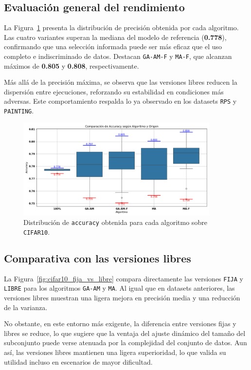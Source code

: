 \subsection{Evaluación general del rendimiento}
La Figura~\ref{fig:cifar10_boxplot} presenta la distribución de precisión obtenida por cada algoritmo.
Las cuatro variantes superan la mediana del modelo de referencia (\textbf{0.778}), confirmando que una selección informada puede ser más eficaz que el uso completo e indiscriminado de datos.
Destacan \texttt{GA-AM-F} y \texttt{MA-F}, que alcanzan máximos de \textbf{0.805} y \textbf{0.808}, respectivamente.

Más allá de la precisión máxima, se observa que las versiones libres reducen la dispersión entre ejecuciones, reforzando su estabilidad en condiciones más adversas.
Este comportamiento respalda lo ya observado en los datasets \texttt{RPS} y \texttt{PAINTING}.

\begin{figure}[htp]
  \centering
  \includegraphics[width=0.9\textwidth]{imagenes/evaluaciones/cifar10/boxplot-por-algoritmo.png}
  \caption{Distribución de \texttt{accuracy} obtenida para cada algoritmo sobre \texttt{CIFAR10}.}
  \label{fig:cifar10_boxplot}
\end{figure}

\subsection{Comparativa con las versiones libres}
La Figura~\ref{fig:cifar10_fija_vs_libre} compara directamente las versiones \texttt{FIJA} y \texttt{LIBRE} para los algoritmos \texttt{GA-AM} y \texttt{MA}.
Al igual que en datasets anteriores, las versiones libres muestran una ligera mejora en precisión media y una reducción de la varianza.

No obstante, en este entorno más exigente, la diferencia entre versiones fijas y libres se reduce,
lo que sugiere que la ventaja del ajuste dinámico del tamaño del subconjunto puede verse atenuada por la complejidad del conjunto de datos.
Aun así, las versiones libres mantienen una ligera superioridad, lo que valida su utilidad incluso en escenarios de mayor dificultad.

